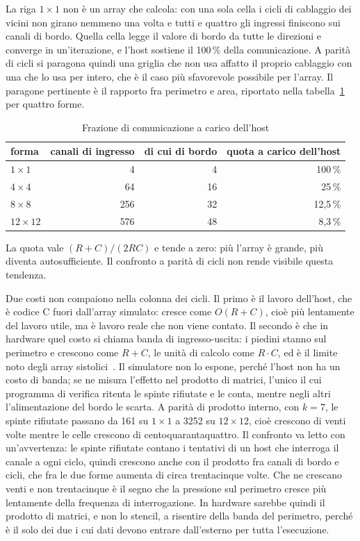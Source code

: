 La riga $1\times1$ non è un array che calcola: con una sola cella i cicli di
cablaggio dei vicini non girano nemmeno una volta e tutti e quattro gli
ingressi finiscono sui canali di bordo. Quella cella legge il valore di bordo da tutte
le direzioni e converge in un'iterazione, e l'host sostiene il 100\,\% della
comunicazione. A parità di cicli si paragona quindi una griglia che non usa
affatto il proprio cablaggio con una che lo usa per intero, che è il caso più
sfavorevole possibile per l'array. Il paragone pertinente è il rapporto fra
perimetro e area, riportato nella tabella~\ref{tab:perimetro} per quattro
forme.

\begin{table}[htbp]
    \centering
    \begin{tabular}{lrrr}
        \toprule
        forma & canali di ingresso & di cui di bordo & quota a carico dell'host \\
        \midrule
        $1\times1$    & 4   & 4  & 100\,\% \\
        $4\times4$    & 64  & 16 & 25\,\% \\
        $8\times8$    & 256 & 32 & 12,5\,\% \\
        $12\times12$  & 576 & 48 & 8,3\,\% \\
        \bottomrule
    \end{tabular}
    \caption{Frazione di comunicazione a carico dell'host}
    \label{tab:perimetro}
\end{table}

La quota vale $(R+C)/(2RC)$ e tende a zero: più l'array è grande, più diventa autosufficiente.
Il confronto a parità di cicli non rende visibile questa tendenza.

Due costi non compaiono nella colonna dei cicli. Il primo è il lavoro
dell'host, che è codice C fuori dall'array simulato: cresce come $O(R+C)$,
cioè più lentamente del lavoro utile, ma è lavoro reale che non viene contato.
Il secondo è che in hardware quel costo si chiama banda di ingresso-uscita: i
piedini stanno sul perimetro e crescono come $R+C$, le unità
di calcolo come $R \cdot C$, ed è il limite noto degli array
sistolici~\cite{KungLeiserson}. Il simulatore non lo espone, perché l'host non
ha un costo di banda; se ne misura l'effetto nel prodotto di matrici, l'unico
il cui programma di verifica ritenta le spinte rifiutate e le conta,
mentre negli altri l'alimentazione del bordo le scarta. A parità
di prodotto interno, con $k=7$, le spinte rifiutate passano da 161 su $1\times1$
a 3252 su $12\times12$, cioè crescono di venti volte mentre le celle crescono di
centoquarantaquattro. Il confronto va letto con un'avvertenza: le spinte rifiutate contano i tentativi di un host che interroga il canale a ogni ciclo, quindi
crescono anche con il prodotto fra canali di bordo e cicli, che fra le due
forme aumenta di circa trentacinque volte. Che ne crescano venti e non
trentacinque è il segno che la pressione sul perimetro cresce più lentamente
della frequenza di interrogazione.
In hardware sarebbe quindi il prodotto di matrici, e non lo stencil, a
risentire della banda del perimetro, perché è il solo dei due i cui dati
devono entrare dall'esterno per tutta l'esecuzione.


